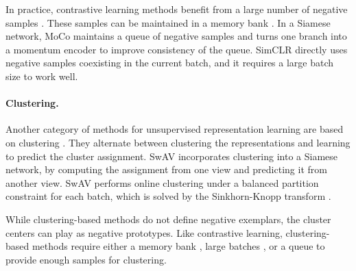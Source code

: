 \documentclass[final]{cvpr}
\begin{document}
In practice, contrastive learning methods benefit from a large number of negative samples \cite{Wu2018a,Tian2019,He2019a,Chen2020}. 
These samples can be maintained in a memory bank \cite{Wu2018a}. In a Siamese network, MoCo \cite{He2019a} maintains a queue of negative samples and turns one branch into a momentum encoder to improve consistency of the queue.
SimCLR \cite{Chen2020} directly uses negative samples coexisting in the current batch, and it requires a large batch size to work well.

\paragraph{Clustering.} Another category of methods for unsupervised representation learning are based on clustering \cite{Caron2018,Caron2019,Asano2019,Caron2020}.
They alternate between clustering the representations and learning to predict the cluster assignment.
SwAV \cite{Caron2020} incorporates clustering into a Siamese network, by computing the assignment from one view and predicting it from another view.
SwAV performs online clustering under a balanced partition constraint for each batch, which is solved by the Sinkhorn-Knopp transform \cite{Cuturi2013}.

While clustering-based methods do not define negative \mbox{exemplars}, the cluster centers can play as negative prototypes.
Like contrastive learning, clustering-based methods require either a memory bank \cite{Caron2018,Caron2019,Asano2019}, large batches \cite{Caron2020}, or a queue \cite{Caron2020} to provide enough samples for clustering.
\end{document}
